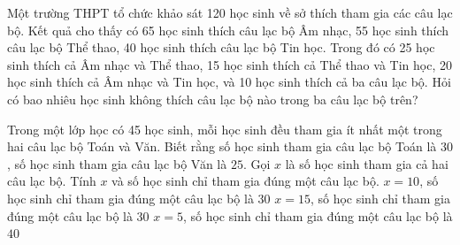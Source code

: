 \begin{bt}
\end{bt}

\begin{ex}%
Một trường THPT tổ chức khảo sát 120 học sinh về sở thích tham gia các câu lạc bộ. Kết quả cho thấy có 65 học sinh thích câu lạc bộ Âm nhạc, 55 học sinh thích câu lạc bộ Thể thao, 40 học sinh thích câu lạc bộ Tin học. Trong đó có 25 học sinh thích cả Âm nhạc và Thể thao, 15 học sinh thích cả Thể thao và Tin học, 20 học sinh thích cả Âm nhạc và Tin học, và 10 học sinh thích cả ba câu lạc bộ. Hỏi có bao nhiêu học sinh không thích câu lạc bộ nào trong ba câu lạc bộ trên?
\end{ex}

\begin{ex}%
Trong một lớp học có 45 học sinh, mỗi học sinh đều tham gia ít nhất một trong hai câu lạc bộ Toán và Văn. Biết rằng số học sinh tham gia câu lạc bộ Toán là $30$, số học sinh tham gia câu lạc bộ Văn là $25$. Gọi $x$ là số học sinh tham gia cả hai câu lạc bộ. Tính $x$ và số học sinh chỉ tham gia đúng một câu lạc bộ.
{$x=10$, số học sinh chỉ tham gia đúng một câu lạc bộ là $30$}
{$x=15$, số học sinh chỉ tham gia đúng một câu lạc bộ là $30$}
{$x=5$, số học sinh chỉ tham gia đúng một câu lạc bộ là $40$}
\end{ex}
